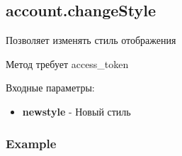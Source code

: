 \subsection{account.changeStyle}
Позволяет изменять стиль отображения

Метод требует access\_token

Входные параметры:
\begin{itemize}
  \item \textbf{newstyle} - Новый стиль
\end{itemize}

\subsubsection{Example}
\begin{Verbatim}[frame=single]

\end{Verbatim}
